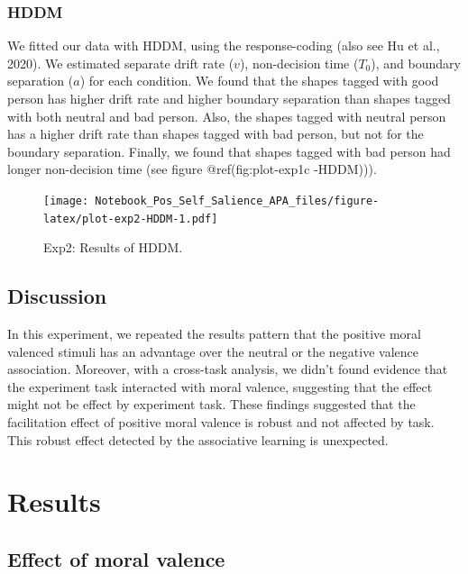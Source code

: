 \documentclass[
  english,
  man]{apa6}
\begin{document}
\hypertarget{hddm-3}{%
\subsubsection{HDDM}\label{hddm-3}}

We fitted our data with HDDM, using the response-coding (also see Hu et al., 2020). We estimated separate drift rate (\(v\)), non-decision time (\(T_{0}\)), and boundary separation (\(a\)) for each condition. We found that the shapes tagged with good person has higher drift rate and higher boundary separation than shapes tagged with both neutral and bad person. Also, the shapes tagged with neutral person has a higher drift rate than shapes tagged with bad person, but not for the boundary separation. Finally, we found that shapes tagged with bad person had longer non-decision time (see figure @ref(fig:plot-exp1c
-HDDM))).

\begin{figure}
\centering
\texttt{[image: Notebook\_Pos\_Self\_Salience\_APA\_files/figure-latex/plot-exp2-HDDM-1.pdf]}
\caption{\label{fig:plot-exp2-HDDM}Exp2: Results of HDDM.}
\end{figure}

\hypertarget{discussion-1}{%
\subsection{Discussion}\label{discussion-1}}

In this experiment, we repeated the results pattern that the positive moral valenced stimuli has an advantage over the neutral or the negative valence association. Moreover, with a cross-task analysis, we didn't found evidence that the experiment task interacted with moral valence, suggesting that the effect might not be effect by experiment task.
These findings suggested that the facilitation effect of positive moral valence is robust and not affected by task. This robust effect detected by the associative learning is unexpected.

\hypertarget{results-4}{%
\section{Results}\label{results-4}}

\hypertarget{effect-of-moral-valence}{%
\subsection{Effect of moral valence}\label{effect-of-moral-valence}}
\end{document}
